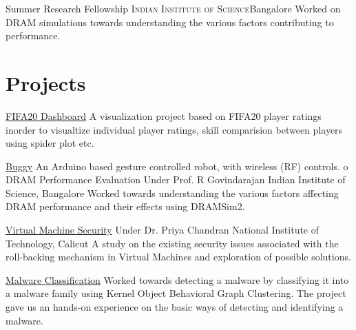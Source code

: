 \documentclass[11pt,a4paper,sans]{moderncv}
\begin{document}
                {Summer Research Fellowship}
                {\textsc{Indian Institute of Science}}{Bangalore}
                {}
                {
                    Worked on  DRAM simulations towards understanding the
                    various factors contributing to performance.
                }


\section{Projects}
    \cventry{}
            {\href{https://github.com/sachinboban/datavis-fifa20-dashboard}{FIFA20 Dashboard}}
            {}
            {}
            {}
            {
                A visualization project based on FIFA20 player ratings inorder
                to visualtize individual player ratings, skill comparision
                between players using spider plot etc.
            }

    \cventry{}
            {\href{https://github.com/sachinboban/buggy}{Buggy}}
            {}
            {}
            {}
            {
                An Arduino based gesture controlled robot, with wireless (RF)
                controls.
            o}
    \cventry{}
            {DRAM Performance Evaluation}
            {Under Prof. R Govindarajan}
            {Indian Institute of Science, Bangalore}
            {}
            {
                Worked towards understanding the  various factors affecting DRAM
                performance and their effects using DRAMSim2.
            }

    \cventry{}
            {\href{https://sachinboban.github.io/assets/files/vms.pdf}{Virtual Machine Security}}
            {Under Dr. Priya Chandran}
            {National Institute of Technology, Calicut}
            {}
            {
                A study on the existing security issues associated with the
                roll-backing mechanism in Virtual Machines and exploration of
                possible solutions.
            }

    \cventry{}
            {\href{https://github.com/rahulp0491/Malware-Classifier}{Malware Classification}}
            {}
            {}
            {}
            {
                Worked towards detecting a malware by classifying it into a
                malware family using Kernel Object Behavioral Graph Clustering.
                The project gave us an hands-on experience on the basic ways of
                detecting and identifying a malware.
            }
\end{document}

